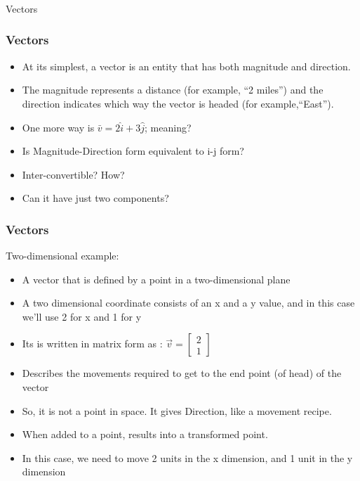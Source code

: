 \newcommand{\R}{\mathbb{R}}
\newcommand{\norm}[1]{\lVert#1\rVert} %
\newcommand{\avg}[1]{\left< #1 \right>} %
\newcommand{\abs}[1]{\bigl| #1 \bigr|} %

\begin{frame}[fragile]\frametitle{}
\begin{center}
{\Large Vectors}
\end{center}
\end{frame}


 \begin{frame}[fragile] \frametitle{Vectors}

\begin{itemize}

\item At its simplest, a vector is an entity that has both magnitude and direction. 
\item The magnitude represents a distance (for example, ``2 miles'') and the direction indicates which way the vector is headed (for example,``East''). 
\item One more way is $\bar{v} = 2\hat{i} + 3\hat{j}$; meaning?
\item Is Magnitude-Direction form equivalent to i-j form?
\item Inter-convertible? How?
\item Can it have just two components?
\end{itemize}

\end{frame}




 \begin{frame}[fragile] \frametitle{Vectors}
Two-dimensional example:
\begin{itemize}

\item A vector that is defined by a point in a two-dimensional plane
\item A two dimensional coordinate consists of an x and a y value, and in this case we'll use 2 for x and 1 for y
\item Its is written in matrix form as : $\vec{v} = \begin{bmatrix}2 \\ 1 \end{bmatrix}$
\item Describes the movements required to get to the end point (of head) of the vector 
\item So, it is not a point in space. It gives Direction, like a movement recipe. 
\item When added to a point, results into a transformed point.
\item In this case, we need to move 2 units in the x dimension, and 1 unit in the y dimension
\end{itemize}

\end{frame}

